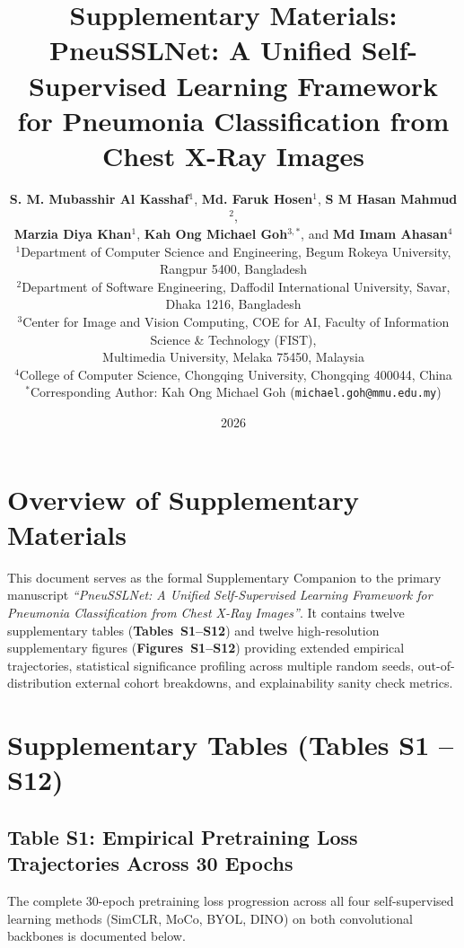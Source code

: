 \documentclass[11pt,a4paper]{article}
\title{\textbf{\Large Supplementary Materials:}\\[0.4em]
\textbf{\LARGE PneuSSLNet: A Unified Self-Supervised Learning Framework for Pneumonia Classification from Chest X-Ray Images}}
\author{
\textbf{S. M. Mubasshir Al Kasshaf}$^{1}$, \textbf{Md. Faruk Hosen}$^{1}$, \textbf{S M Hasan Mahmud}$^{2}$,\\
\textbf{Marzia Diya Khan}$^{1}$, \textbf{Kah Ong Michael Goh}$^{3,*}$, and \textbf{Md Imam Ahasan}$^{4}$\\[0.5em]
\small $^{1}$Department of Computer Science and Engineering, Begum Rokeya University, Rangpur 5400, Bangladesh\\
\small $^{2}$Department of Software Engineering, Daffodil International University, Savar, Dhaka 1216, Bangladesh\\
\small $^{3}$Center for Image and Vision Computing, COE for AI, Faculty of Information Science \& Technology (FIST),\\
\small Multimedia University, Melaka 75450, Malaysia\\
\small $^{4}$College of Computer Science, Chongqing University, Chongqing 400044, China\\
\small $^*$Corresponding Author: Kah Ong Michael Goh (\texttt{michael.goh@mmu.edu.my})
}
\date{2026}
\begin{document}
\maketitle

\vspace{-1em}
\tableofcontents
\newpage

\section{Overview of Supplementary Materials}
This document serves as the formal Supplementary Companion to the primary manuscript \emph{``PneuSSLNet: A Unified Self-Supervised Learning Framework for Pneumonia Classification from Chest X-Ray Images''}. It contains twelve supplementary tables (\textbf{Tables~S1--S12}) and twelve high-resolution supplementary figures (\textbf{Figures~S1--S12}) providing extended empirical trajectories, statistical significance profiling across multiple random seeds, out-of-distribution external cohort breakdowns, and explainability sanity check metrics.

\section{Supplementary Tables (Tables S1 -- S12)}

\subsection*{Table S1: Empirical Pretraining Loss Trajectories Across 30 Epochs}
The complete 30-epoch pretraining loss progression across all four self-supervised learning methods (SimCLR, MoCo, BYOL, DINO) on both convolutional backbones is documented below.
\end{document}
